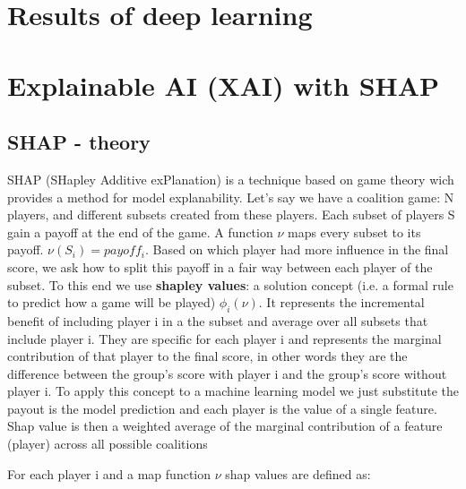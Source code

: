 \documentclass[a4paper,11pt]{article}
\begin{document}
\section{Results of deep learning}


\section{Explainable AI (XAI) with SHAP}
\subsection{SHAP - theory}
SHAP (SHapley Additive exPlanation) is a technique based on game theory wich provides a method for model explanability.
Let's say we have a coalition game: N players, and different subsets created from these players. Each subset of players S gain a payoff at the end of the game. A function $\nu$ maps every subset to its payoff. $\nu(S_i) = payoff_i$. Based on which player had more influence in the final score, we ask how to split this payoff in a fair way between each player of the subset.
To this end we use \textbf{shapley values}: a solution concept (i.e. a formal rule to predict how a game will be played) $\phi_i(\nu)$. It represents the incremental benefit of including player i in a the subset and average over all subsets that include player i.
They are specific for each player i and represents the marginal contribution of that player to the final score, in other words they are the difference between the group's score with player i and the group's score without player i.
To apply this concept to a machine learning model we just substitute the payout is the model prediction and each player is the value of a single feature.
Shap value is then a weighted average of the marginal contribution of a feature (player) across all possible coalitions

For each player i and a map function $\nu$ shap values are defined as:
\end{document}
